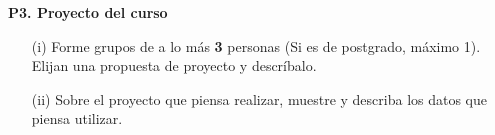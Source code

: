 \documentclass[11pt,letterpaper]{article}
\begin{document}
\vspace{5 mm}
\noindent\textbf{P3. Proyecto del curso} %
\vspace{5 mm}


\begin{itemize}
	\item[(i)] Forme grupos de a lo más \textbf{3} personas (Si es de postgrado, máximo 1). Elijan una propuesta de proyecto y descríbalo.
	\item[(ii)] Sobre el proyecto que piensa realizar, muestre y describa los datos que piensa utilizar.
\end{itemize}
\end{document}
